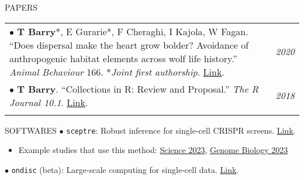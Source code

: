 \documentclass{resume} %
\begin{document}
\begin{rSection}{PAPERS}
\begin{tabular}{p{14cm}R{2.5cm}}
	$\bullet$ \textbf{T Barry}*, E Gurarie*, F Cheraghi, I Kajola, W Fagan. ``Does dispersal make the heart grow bolder? Avoidance of anthropogenic habitat elements across wolf life history.'' \textit{Animal Behaviour} 166. *\textit{Joint first authorship}. \href{https://www.sciencedirect.com/science/article/pii/S0003347220301743}{Link}. & \textit{2020}  \\
	$\bullet$ \textbf{T Barry}. ``Collections in R: Review and Proposal.'' \textit{The R Journal 10.1}. \href{https://journal.r-project.org/archive/2018/RJ-2018-037/index.html}{Link}. & \textit{2018} \\ &
\end{tabular} 	
\end{rSection}


\begin{rSection}{SOFTWARES}
	$\bullet$ \texttt{sceptre}: Robust inference for single-cell CRISPR screens. \href{https://katsevich-lab.github.io/sceptre/}{Link}.
	\begin{itemize}
		\item Example studies that use this method: \href{https://www.science.org/doi/10.1126/science.adh7699}{Science 2023}, \href{https://genomebiology.biomedcentral.com/articles/10.1186/s13059-023-02898-w}{Genome Biology 2023}
	\end{itemize}
	
	$\bullet$ \texttt{ondisc} (beta): Large-scale computing for single-cell data. \href{https://github.com/timothy-barry/ondisc}{Link}.
\end{rSection}
\end{document}
